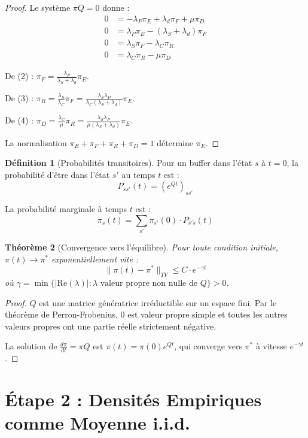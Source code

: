 \documentclass[11pt,a4paper]{article}
\theoremstyle{plain}
\newtheorem{theorem}{Théorème}[section]
\theoremstyle{definition}
\newtheorem{definition}[theorem]{Définition}
\theoremstyle{remark}
\begin{document}
\begin{proof}
Le système $\pi Q = 0$ donne :
\begin{align}
0 &= -\lambda_P \pi_E + \lambda_d \pi_F + \mu \pi_D \\
0 &= \lambda_P \pi_E - (\lambda_S + \lambda_d) \pi_F \\
0 &= \lambda_S \pi_F - \lambda_C \pi_R \\
0 &= \lambda_C \pi_R - \mu \pi_D
\end{align}

De (2) : $\pi_F = \frac{\lambda_P}{\lambda_S + \lambda_d} \pi_E$.

De (3) : $\pi_R = \frac{\lambda_S}{\lambda_C} \pi_F = \frac{\lambda_S \lambda_P}{\lambda_C(\lambda_S + \lambda_d)} \pi_E$.

De (4) : $\pi_D = \frac{\lambda_C}{\mu} \pi_R = \frac{\lambda_S \lambda_P}{\mu(\lambda_S + \lambda_d)} \pi_E$.

La normalisation $\pi_E + \pi_F + \pi_R + \pi_D = 1$ détermine $\pi_E$.
\end{proof}

\begin{definition}[Probabilités transitoires]
Pour un buffer dans l'état $s$ à $t=0$, la probabilité d'être dans l'état $s'$ au temps $t$ est :
\[
P_{ss'}(t) = (e^{Qt})_{ss'}
\]

La probabilité marginale à temps $t$ est :
\[
\pi_s(t) = \sum_{s'} \pi_{s'}(0) \cdot P_{s's}(t)
\]
\end{definition}

\begin{theorem}[Convergence vers l'équilibre]\label{thm:single_buffer_convergence}
Pour toute condition initiale, $\pi(t) \to \pi^*$ exponentiellement vite :
\[
\|\pi(t) - \pi^*\|_{TV} \leq C \cdot e^{-\gamma t}
\]
où $\gamma = \min\{|\text{Re}(\lambda)| : \lambda \text{ valeur propre non nulle de } Q\} > 0$.
\end{theorem}

\begin{proof}
$Q$ est une matrice génératrice irréductible sur un espace fini. Par le théorème de Perron-Frobenius, 0 est valeur propre simple et toutes les autres valeurs propres ont une partie réelle strictement négative.

La solution de $\frac{d\pi}{dt} = \pi Q$ est $\pi(t) = \pi(0) e^{Qt}$, qui converge vers $\pi^*$ à vitesse $e^{-\gamma t}$.
\end{proof}

\section{Étape 2 : Densités Empiriques comme Moyenne i.i.d.}
\end{document}
